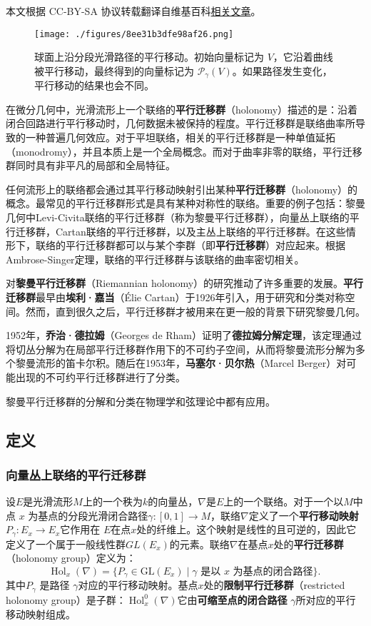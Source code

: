 
本文根据 CC-BY-SA 协议转载翻译自维基百科\href{https://en.wikipedia.org/wiki/Holonomy}{相关文章}。

\begin{figure}[ht]
\centering
\texttt{[image: ./figures/8ee31b3dfe98af26.png]}
\caption{球面上沿分段光滑路径的平行移动。初始向量标记为 \(V\)，它沿着曲线被平行移动，最终得到的向量标记为 \( \mathcal{P}_\gamma (V) \)。如果路径发生变化，平行移动的结果也会不同。} \label{fig_WZQ_1}
\end{figure}
在微分几何中，光滑流形上一个联络的\textbf{平行迁移群}（holonomy）描述的是：沿着闭合回路进行平行移动时，几何数据未被保持的程度。平行迁移群是联络曲率所导致的一种普遍几何效应。对于平坦联络，相关的平行迁移群是一种单值延拓（monodromy），并且本质上是一个全局概念。而对于曲率非零的联络，平行迁移群同时具有非平凡的局部和全局特征。

任何流形上的联络都会通过其平行移动映射引出某种\textbf{平行迁移群}（holonomy）的概念。最常见的平行迁移群形式是具有某种对称性的联络。重要的例子包括：黎曼几何中Levi-Civita联络的平行迁移群（称为黎曼平行迁移群），向量丛上联络的平行迁移群，Cartan联络的平行迁移群，以及主丛上联络的平行迁移群。在这些情形下，联络的平行迁移群都可以与某个李群（即\textbf{平行迁移群}）对应起来。根据Ambrose-Singer定理，联络的平行迁移群与该联络的曲率密切相关。

对\textbf{黎曼平行迁移群}（Riemannian holonomy）的研究推动了许多重要的发展。\textbf{平行迁移群}最早由\textbf{埃利·嘉当}（Élie Cartan）于1926年引入，用于研究和分类对称空间。然而，直到很久之后，平行迁移群才被用来在更一般的背景下研究黎曼几何。

1952年，\textbf{乔治·德拉姆}（Georges de Rham）证明了\textbf{德拉姆分解定理}，该定理通过将切丛分解为在局部平行迁移群作用下的不可约子空间，从而将黎曼流形分解为多个黎曼流形的笛卡尔积。随后在1953年，\textbf{马塞尔·贝尔热}（Marcel Berger）对可能出现的不可约平行迁移群进行了分类。

黎曼平行迁移群的分解和分类在物理学和弦理论中都有应用。
\subsection{定义} 
\subsubsection{向量丛上联络的平行迁移群}  
设\(E\)是光滑流形\(M\)上的一个秩为\(k\)的向量丛，\(\nabla\)是\(E\)上的一个联络。对于一个以\(M\)中点 \(x\) 为基点的分段光滑闭合路径\(\gamma : [0,1] \to M\)，联络\(\nabla\)定义了一个\textbf{平行移动映射}\(P_\gamma : E_x \to E_x\)它作用在 \(E\)在点\(x\)处的纤维上。这个映射是线性的且可逆的，因此它定义了一个属于一般线性群\(GL(E_x)\)的元素。联络\(\nabla\)在基点\(x\)处的\textbf{平行迁移群}（holonomy group）定义为：
\[
\operatorname{Hol}_x(\nabla) = \{P_\gamma \in \mathrm{GL}(E_x) \mid \gamma \text{ 是以 } x \text{ 为基点的闭合路径}\}.~
\]
其中\(P_\gamma\) 是路径 \(\gamma\)对应的平行移动映射。基点\(x\)处的\textbf{限制平行迁移群}（restricted holonomy group）是子群：\(\operatorname{Hol}_x^0(\nabla)\)它由\textbf{可缩至点的闭合路径} \(\gamma\)所对应的平行移动映射组成。


